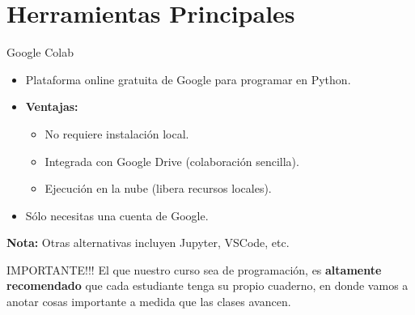 \documentclass[10pt]{beamer}
\begin{document}
\section{Herramientas Principales}

\begin{frame}{Google Colab}
  \begin{itemize}
    \item Plataforma online gratuita de Google para programar en Python.
    \item \textbf{Ventajas:}
      \begin{itemize}
        \item No requiere instalación local.
        \item Integrada con Google Drive (colaboración sencilla).
        \item Ejecución en la nube (libera recursos locales).
      \end{itemize}
    \item Sólo necesitas una cuenta de Google.
  \end{itemize}
  \vspace{0.3cm}
  \textbf{Nota:} Otras alternativas incluyen Jupyter, VSCode, etc.

  \begin{block}{IMPORTANTE!!!}
    El que nuestro curso sea de programación, es \textbf{altamente recomendado} que cada estudiante tenga su propio cuaderno, en donde vamos a anotar cosas importante a medida que las clases avancen.
  \end{block}
\end{frame}
\end{document}
